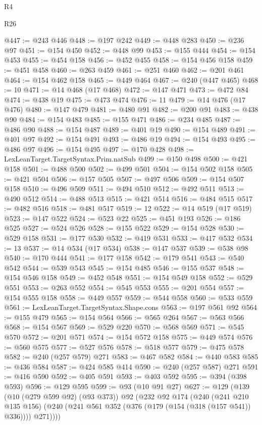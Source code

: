 \begin{lexlean}{R4}
\begin{lexlean}{R26}
\begin{coremodule}
{{{{{{{{{{{{{{{{{{{{{{{{{{{{{{{{{{{{{{{{{{{{{{{{{{{{{{{{{{{{{{{{{{{{{{{{@447 := @243 @446
@448 := @197 @242
@449 := @448 @283
@450 := @236 @97
@451 := @154 @450
@452 := @448 @99
@453 := @155 @444
@454 := @154 @453
@455 := @454 @158
@456 := @452 @455
@458 := @154 @456 @158
@459 := @451 @458
@460 := @263 @459
@461 := @251 @460
@462 := @201 @461
@464 := @154 @462 @158
@465 := @449 @464
@467 := @240 (@447 @465)
@468 := 10
@471 := @14 @468 (@17 @468)
@472 := @147 @471
@473 := @472 @84
@474 := @438 @19
@475 := @473 @474
@476 := 11
@479 := @14 @476 (@17 @476)
@480 := @147 @479
@481 := @480 @91
@482 := @200 @91
@483 := @438 @90
@484 := @154 @483
@485 := @155 @471
@486 := @234 @485
@487 := @486 @90
@488 := @154 @487
@489 := @401 @19
@490 := @154 @489
@491 := @401 @97
@492 := @154 @491
@493 := @486 @19
@494 := @154 @493
@495 := @486 @97
@496 := @154 @495
@497 := @170 @428
@498 := LexLeanTarget.TargetSyntax.Prim.natSub
@499 := @150 @498
@500 := @421 @158
@501 := @488 @500
@502 := @499 @501
@504 := @154 @502 @158
@505 := @421 @504
@506 := @157 @505
@507 := @497 @506
@509 := @154 @507 @158
@510 := @496 @509
@511 := @494 @510
@512 := @492 @511
@513 := @490 @512
@514 := @488 @513
@515 := @421 @514
@516 := @484 @515
@517 := @482 @516
@518 := @481 @517
@519 := 12
@522 := @14 @519 (@17 @519)
@523 := @147 @522
@524 := @523 @22
@525 := @451 @193
@526 := @186 @525
@527 := @524 @526
@528 := @155 @522
@529 := @154 @528
@530 := @529 @158
@531 := @177 @530
@532 := @419 @531
@533 := @417 @532
@534 := 13
@537 := @14 @534 (@17 @534)
@538 := @147 @537
@539 := @538 @98
@540 := @170 @444
@541 := @177 @158
@542 := @179 @541
@543 := @540 @542
@544 := @539 @543
@545 := @154 @485
@546 := @155 @537
@548 := @154 @546 @158
@549 := @452 @548
@551 := @154 @549 @158
@552 := @529 @551
@553 := @263 @552
@554 := @545 @553
@555 := @201 @554
@557 := @154 @555 @158
@558 := @449 @557
@559 := @544 @558
@560 := @533 @559
@561 := LexLeanTarget.TargetSyntax.Shape.cons
@563 := @197 @561 @92
@564 := @155 @479
@565 := @154 @564
@566 := @565 @264
@567 := @563 @566
@568 := @154 @567
@569 := @529 @220
@570 := @568 @569
@571 := @545 @570
@572 := @201 @571
@574 := @154 @572 @158
@575 := @449 @574
@576 := @560 @575
@577 := @527 @576
@578 := @518 @577
@579 := @475 @578
@582 := @240 (@257 @579) @271
@583 := @467 @582
@584 := @440 @583
@585 := @436 @584
@587 := @424 @585 @414
@590 := @240 (@257 @587) @271
@591 := @416 @590
@592 := @405 @591
@593 := @403 @592
@595 := @394 (@398 @593)
@596 := @129 @595
@599 := @93 (@10 @91 @27)
@627 := @129
    (@139
      (@10 (@279 @599 @92) (@93 @373))
      @92
      (@232
        @92
        @174
        (@240
          (@241 @210 @135 @156)
          (@240 (@241 @561 @352 (@376 (@179 (@154 (@318 (@157 @541)) @336)))) @271))))
}}}}}}}}}}}}}}}}}}}}}}}}}}}}}}}}}}}}}}}}}}}}}}}}}}}}}}}}}}}}}}}}}}}}}}}}
\end{coremodule}
\end{lexlean}
\end{lexlean}
